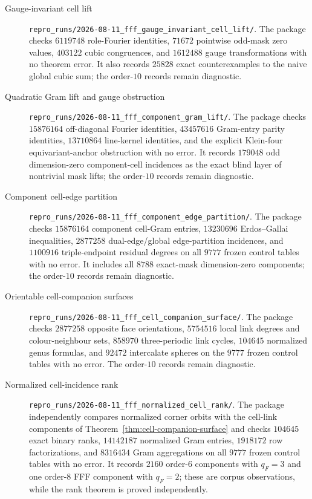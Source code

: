 \begin{description}
\item[Gauge-invariant cell lift]
\nolinkurl{repro_runs/2026-08-11_fff_gauge_invariant_cell_lift/}.
The package checks $6119748$ role-Fourier identities, $71672$ pointwise
odd-mask zero values, $403122$ cubic congruences, and $1612488$ gauge
transformations with no theorem error.  It also records $25828$ exact
counterexamples to the naive global cubic sum; the order-$10$ records remain
diagnostic.

\item[Quadratic Gram lift and gauge obstruction]
\nolinkurl{repro_runs/2026-08-11_fff_component_gram_lift/}.
The package checks $15876164$ off-diagonal Fourier identities, $43457616$
Gram-entry parity identities, $13710864$ line-kernel identities, and the
explicit Klein-four equivariant-anchor obstruction with no error.  It records
$179048$ odd dimension-zero component-cell incidences as the exact blind
layer of nontrivial mask lifts; the order-$10$ records remain diagnostic.

\item[Component cell-edge partition]
\nolinkurl{repro_runs/2026-08-11_fff_component_edge_partition/}.
The package checks $15876164$ component cell-Gram entries, $13230696$
Erdos--Gallai inequalities, $2877258$ dual-edge/global edge-partition
incidences, and $1100916$ triple-endpoint residual degrees on all $9777$
frozen control
tables with no error.  It includes all $8788$ exact-mask dimension-zero
components; the order-$10$ records remain diagnostic.

\item[Orientable cell-companion surfaces]
\nolinkurl{repro_runs/2026-08-11_fff_cell_companion_surface/}.
The package checks $2877258$ opposite face orientations, $5754516$ local
link degrees and colour-neighbour sets, $858970$ three-periodic link cycles,
$104645$ normalized genus formulas, and $92472$ intercalate spheres on the
$9777$ frozen control tables with no error.  The order-$10$ records remain
diagnostic.

\item[Normalized cell-incidence rank]
\nolinkurl{repro_runs/2026-08-11_fff_normalized_cell_rank/}.
The package independently compares normalized corner orbits with the
cell-link components of Theorem~\ref{thm:cell-companion-surface} and checks
$104645$ exact binary ranks, $14142187$
normalized Gram entries, $1918172$ row factorizations, and $8316434$ Gram
aggregations on all $9777$ frozen control tables with no error.  It records
$2160$ order-$6$ components with $q_F=3$ and one order-$8$ FFF component with
$q_F=2$; these are corpus observations, while the rank theorem is proved
independently.


\end{description}
